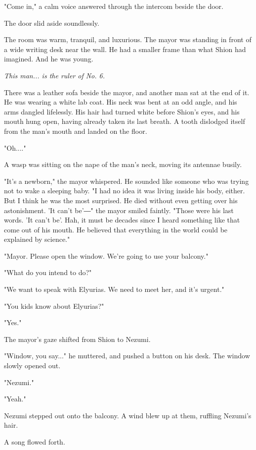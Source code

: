 "Come in," a calm voice answered through the intercom beside the door.

The door slid aside soundlessly.

The room was warm, tranquil, and luxurious. The mayor was standing in
front of a wide writing desk near the wall. He had a smaller frame than
what Shion had imagined. And he was young.

\emph{This man... is the ruler of No. 6.}

There was a leather sofa beside the mayor, and another man sat at the
end of it. He was wearing a white lab coat. His neck was bent at an odd
angle, and his arms dangled lifelessly. His hair had turned white before
Shion's eyes, and his mouth hung open, having already taken its last
breath. A tooth dislodged itself from the man's mouth and landed on the
floor.

"Oh...."

A wasp was sitting on the nape of the man's neck, moving its antennae
busily.

"It's a newborn," the mayor whispered. He sounded like someone who was
trying not to wake a sleeping baby. "I had no idea it was living inside
his body, either. But I think he was the most surprised. He died without
even getting over his astonishment. 'It can't be'―" the mayor smiled
faintly. "Those were his last words. 'It can't be'. Hah, it must be
decades since I heard something like that come out of his mouth. He
believed that everything in the world could be explained by science."

"Mayor. Please open the window. We're going to use your balcony."

"What do you intend to do?"

"We want to speak with Elyurias. We need to meet her, and it's urgent."

"You kids know about Elyurias?"

"Yes."

The mayor's gaze shifted from Shion to Nezumi.

"Window, you say..." he muttered, and pushed a button on his desk. The
window slowly opened out.

"Nezumi."

"Yeah."

Nezumi stepped out onto the balcony. A wind blew up at them, ruffling
Nezumi's hair.

A song flowed forth.


